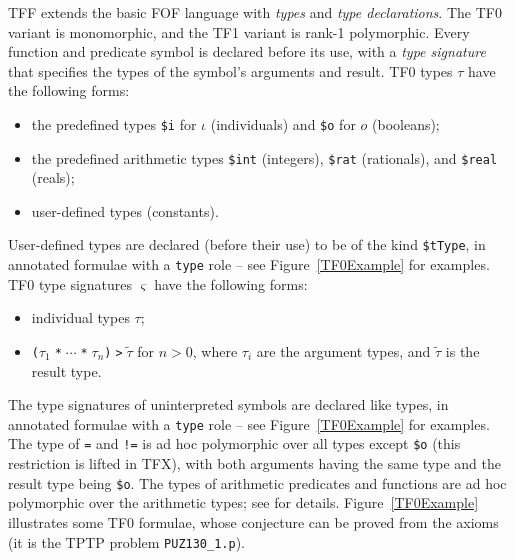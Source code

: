 \documentclass{easychair}
\begin{document}
TFF extends the basic FOF language with {\em types} and {\em type
declarations}.
The TF0 variant is monomorphic, and the TF1 variant is rank-1 polymorphic.
Every function and predicate symbol is declared before its use, with
a {\em type signature} that specifies the types of the symbol's arguments
and result.
TF0 types $\tau$ have the following forms:
\begin{itemize}
\item the predefined types {\tt \$i} for $\iota$ (individuals) and
      {\tt \$o} for $o$ (booleans);
\item the predefined arithmetic types {\tt \$int} (integers), {\tt \$rat}
      (rationals), and {\tt \$real} (reals);
\item user-defined types (constants).
\end{itemize}
User-defined types are declared (before their use) to be of the kind
{\tt \$tType}, in annotated formulae with a {\tt type} role -- see
Figure~\ref{TF0Example} for examples.
TF0 type signatures $\varsigma$ have the following forms:
\begin{itemize}
\item individual types $\tau$;
\item {\tt ($\tau_1\;$*$\;{\cdots}\;$*$\;\tau_n$)$\;$>$\;\tilde \tau$}
      for $n > 0$, where $\tau_i$ are the argument types, and $\tilde \tau$
      is the result type.
\end{itemize}
The type signatures of uninterpreted symbols are declared like types, in
annotated formulae with a {\tt type} role -- see Figure~\ref{TF0Example}
for examples.
The type of {\tt =} and {\tt !=} is ad hoc polymorphic over all types 
except {\tt \$o} (this restriction is lifted in TFX), with both arguments 
having the same type and the result type being {\tt \$o}.
The types of arithmetic predicates and functions are ad hoc polymorphic
over the arithmetic types; see \cite{SS+12} for details.
Figure~\ref{TF0Example} illustrates some TF0 formulae, whose conjecture can
be proved from the axioms (it is the TPTP problem {\tt PUZ130\_1.p}).
\end{document}
